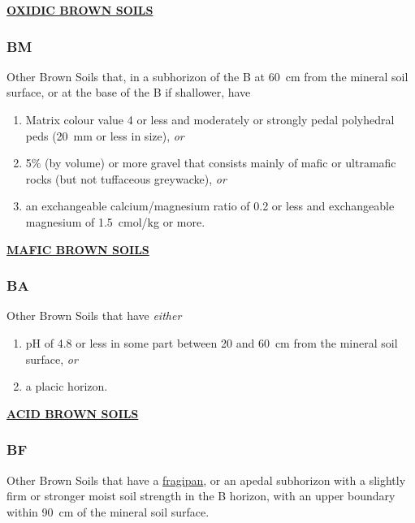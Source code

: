 \documentclass[
  letterpaper,
  DIV=11,
  numbers=noendperiod]{scrreprt}
\providecommand{\tightlist}{%
  \setlength{\itemsep}{0pt}\setlength{\parskip}{0pt}}\usepackage{longtable,booktabs,array}
\begin{document}
\protect\hyperlink{sec-BX}{\textbf{OXIDIC BROWN SOILS}}

\hypertarget{sec-key-BM}{%
\subsubsection{\texorpdfstring{\textbf{BM}}{BM}}\label{sec-key-BM}}

Other Brown Soils that, in a subhorizon of the B at 60~cm from the
mineral soil surface, or at the base of the B if shallower, have

\begin{enumerate}
\def\labelenumi{\arabic{enumi}.}
\tightlist
\item
  Matrix colour value 4 or less and moderately or strongly pedal
  polyhedral peds (20~mm or less in size), \emph{or}
\item
  5\% (by volume) or more gravel that consists mainly of mafic or
  ultramafic rocks (but not tuffaceous greywacke), \emph{or}
\item
  an exchangeable calcium/magnesium ratio of 0.2 or less and
  exchangeable magnesium of 1.5~cmol/kg or more.
\end{enumerate}

\protect\hyperlink{sec-BM}{\textbf{MAFIC BROWN SOILS}}

\hypertarget{sec-key-BA}{%
\subsubsection{\texorpdfstring{\textbf{BA}}{BA}}\label{sec-key-BA}}

Other Brown Soils that have \emph{either}

\begin{enumerate}
\def\labelenumi{\arabic{enumi}.}
\tightlist
\item
  pH of 4.8 or less in some part between 20 and 60~cm from the mineral
  soil surface, \emph{or}
\item
  a placic horizon.
\end{enumerate}

\protect\hyperlink{sec-BA}{\textbf{ACID BROWN SOILS}}

\hypertarget{sec-key-BF}{%
\subsubsection{\texorpdfstring{\textbf{BF}}{BF}}\label{sec-key-BF}}

Other Brown Soils that have a
\protect\hyperlink{sec-diag-fpan}{fragipan}, or an apedal subhorizon
with a slightly firm or stronger moist soil strength in the B horizon,
with an upper boundary within 90~cm of the mineral soil surface.
\end{document}
